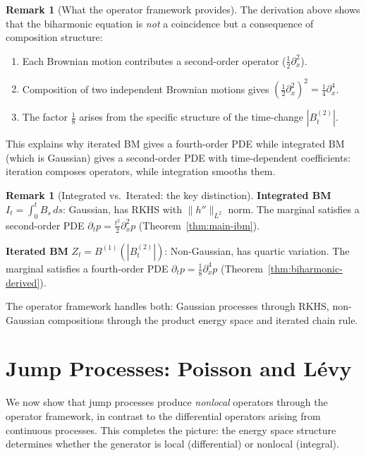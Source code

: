 \documentclass[11pt]{article}
\theoremstyle{definition}
\newtheorem{remark}[theorem]{Remark}
\begin{document}
\begin{remark}[What the operator framework provides]
The derivation above shows that the biharmonic equation is \emph{not} a coincidence but a consequence of composition structure:
\begin{enumerate}
\item Each Brownian motion contributes a second-order operator ($\frac{1}{2}\partial_x^2$).
\item Composition of two independent Brownian motions gives $(\frac{1}{2}\partial_x^2)^2 = \frac{1}{4}\partial_x^4$.
\item The factor $\frac{1}{8}$ arises from the specific structure of the time-change $|B^{(2)}_t|$.
\end{enumerate}

This explains why iterated BM gives a fourth-order PDE while integrated BM (which is Gaussian) gives a second-order PDE with time-dependent coefficients: iteration composes operators, while integration smooths them.
\end{remark}

\begin{remark}[Integrated vs.\ Iterated: the key distinction]
\textbf{Integrated BM} $I_t = \int_0^t B_s\,ds$: Gaussian, has RKHS with $\|h''\|_{L^2}$ norm. The marginal satisfies a second-order PDE $\partial_t p = \frac{t^2}{2}\partial_x^2 p$ (Theorem~\ref{thm:main-ibm}).

\textbf{Iterated BM} $Z_t = B^{(1)}(|B^{(2)}_t|)$: Non-Gaussian, has quartic variation. The marginal satisfies a fourth-order PDE $\partial_t p = \frac{1}{8}\partial_x^4 p$ (Theorem~\ref{thm:biharmonic-derived}).

The operator framework handles both: Gaussian processes through RKHS, non-Gaussian compositions through the product energy space and iterated chain rule.
\end{remark}

\section{Jump Processes: Poisson and L\'evy}\label{sec:levy}

We now show that jump processes produce \emph{nonlocal} operators through the operator framework, in contrast to the differential operators arising from continuous processes. This completes the picture: the energy space structure determines whether the generator is local (differential) or nonlocal (integral).
\end{document}
